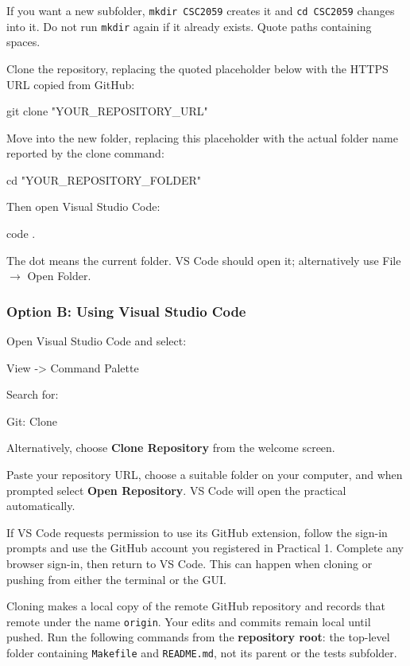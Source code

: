 \documentclass{csc2059practical}
\begin{document}
If you want a new subfolder, \texttt{mkdir CSC2059} creates it and \texttt{cd CSC2059} changes into it. Do not run \texttt{mkdir} again if it already exists. Quote paths containing spaces.

Clone the repository, replacing the quoted placeholder below with the HTTPS URL copied from GitHub:
\begin{bashcode}
git clone "YOUR_REPOSITORY_URL"
\end{bashcode}
Move into the new folder, replacing this placeholder with the actual folder name reported by the clone command:
\begin{bashcode}
cd "YOUR_REPOSITORY_FOLDER"
\end{bashcode}

Then open Visual Studio Code:

\begin{bashcode}
code .
\end{bashcode}

The dot means the current folder. VS Code should open it; alternatively use File $\rightarrow$ Open Folder.

\subsubsection{Option B: Using Visual Studio Code}

Open Visual Studio Code and select:

\begin{terminal}
View -> Command Palette
\end{terminal}

Search for:

\begin{terminal}
Git: Clone
\end{terminal}

Alternatively, choose \textbf{Clone Repository} from the welcome screen.

Paste your repository URL, choose a suitable folder on your computer, and when prompted select \textbf{Open Repository}. VS Code will open the practical automatically.


\begin{importantnote}
If VS Code requests permission to use its GitHub extension, follow the sign-in prompts and use the GitHub account you registered in Practical 1. Complete any browser sign-in, then return to VS Code. This can happen when cloning or pushing from either the terminal or the GUI.
\end{importantnote}
Cloning makes a local copy of the remote GitHub repository and records that remote under the name \texttt{origin}. Your edits and commits remain local until pushed. Run the following commands from the \textbf{repository root}: the top-level folder containing \texttt{Makefile} and \texttt{README.md}, not its parent or the tests subfolder.
\end{document}
